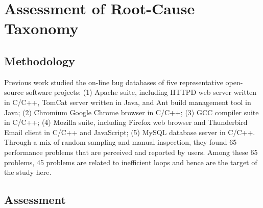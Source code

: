 \section{Assessment of Root-Cause Taxonomy}
\label{sec:eval_taxonomy}

%


\subsection{Methodology}

Previous work \cite{PerfBug,SongOOPSLA2014} studied the on-line bug
databases of five representative open-source software projects:
(1) Apache suite, including HTTPD web server written in C/C++,
TomCat server written in Java, and Ant build management tool in Java;
(2) Chromium Google Chrome browser in C/C++;
(3) GCC compiler suite in C/C++;
(4) Mozilla suite, including Firefox web browser and Thunderbird
Email client in C/C++ and JavaScript; 
(5) MySQL database server in C/C++.
Through a mix of random sampling and 
manual inspection, they 
found 65 performance problems that are perceived and reported by users. 
Among these 65 problems, 45 problems are related to inefficient loops and 
hence are the target of the study 
here.

\subsection{Assessment}
\label{sec:study_ob}

